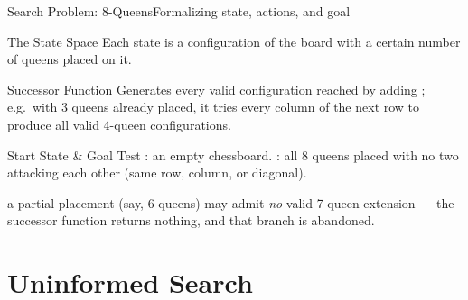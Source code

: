 \documentclass[aspectratio=169,11pt]{beamer}
\begin{document}
\begin{frame}{Search Problem: 8-Queens}{Formalizing state, actions, and goal}
  \begin{block}{The State Space}
    \small Each state is a configuration of the board with a certain number of queens placed on it.
  \end{block}
  \begin{exampleblock}{Successor Function}
    \small Generates every valid configuration reached by adding ; e.g.\
    with 3 queens already placed, it tries every column of the next row to produce all valid
    4-queen configurations.
  \end{exampleblock}
  \begin{alertblock}{Start State \& Goal Test}
    \small {}: an empty chessboard. : all 8 queens placed with no two
    attacking each other (same row, column, or diagonal).
  \end{alertblock}
  \begin{center}\scriptsize
   a partial placement (say, 6 queens) may admit \emph{no} valid 7-queen
  extension — the successor function returns nothing, and that branch is abandoned.
  \end{center}
\end{frame}

\section{Uninformed Search}
\end{document}
